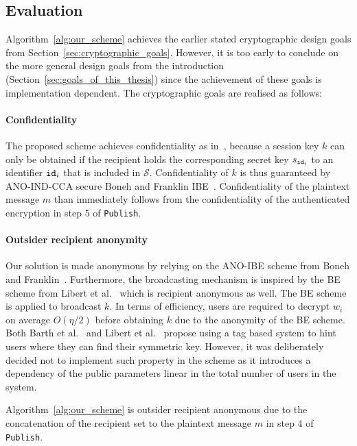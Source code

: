 \subsection{Evaluation}
Algorithm~\ref{alg:our_scheme} achieves the earlier stated cryptographic design goals from Section~\ref{sec:cryptographic_goals}. However, it is too early to conclude on the more general design goals from the introduction (Section~\ref{sec:goals_of_this_thesis}) since the achievement of these goals is implementation dependent. The cryptographic goals are realised as follows:

\paragraph{Confidentiality} The proposed scheme achieves confidentiality as in~\cite{art:BonehF01,art:LibertPQ12}, because a session key $k$ can only be obtained if the recipient holds the corresponding secret key $s_{\mathtt{id}_{i}}$ to an identifier $\mathtt{id}_{i}$ that is included in $\mathcal{S}$. Confidentiality of $k$ is thus guaranteed by ANO-IND-CCA secure Boneh and Franklin IBE~\cite{art:BonehF01}. Confidentiality of the plaintext message $m$ than immediately follows from the confidentiality of the authenticated encryption in step 5 of \texttt{Publish}.

\paragraph{Outsider recipient anonymity} Our solution is made anonymous by relying on the ANO-IBE scheme from Boneh and Franklin~\cite{art:BonehB04}. Furthermore, the broadcasting mechanism is inspired by the BE scheme from Libert et al.~\cite{art:LibertPQ12} which is recipient anonymous as well. The BE scheme is applied to broadcast $k$. In terms of efficiency, users are required to decrypt $w_i$ on average $O\left( \eta /2 \right)$ before obtaining $k$ due to the anonymity of the BE scheme. Both Barth et al.~\cite{art:BarthBW06} and Libert et al.~\cite{art:LibertPQ12} propose using a tag based system to hint users where they can find their symmetric key. However, it was deliberately decided not to implement such property in the scheme as it introduces a dependency of the public parameters linear in the total number of users in the system.

Algorithm~\ref{alg:our_scheme} is outsider recipient anonymous due to the concatenation of the recipient set to the plaintext message $m$ in step 4 of \texttt{Publish}.

